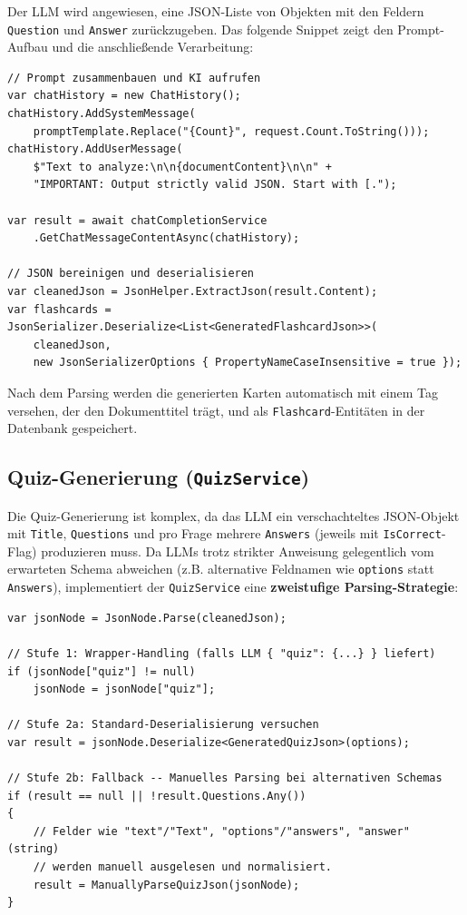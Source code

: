 Der LLM wird angewiesen, eine JSON-Liste von Objekten mit den Feldern \texttt{Question} und \texttt{Answer} zur\"uckzugeben. Das folgende Snippet zeigt den Prompt-Aufbau und die anschlie\ss{}ende Verarbeitung:

\begin{lstlisting}[language={[Sharp]C}, caption={KI-Aufruf und JSON-Parsing in FlashcardService.cs}]
// Prompt zusammenbauen und KI aufrufen
var chatHistory = new ChatHistory();
chatHistory.AddSystemMessage(
    promptTemplate.Replace("{Count}", request.Count.ToString()));
chatHistory.AddUserMessage(
    $"Text to analyze:\n\n{documentContent}\n\n" +
    "IMPORTANT: Output strictly valid JSON. Start with [.");

var result = await chatCompletionService
    .GetChatMessageContentAsync(chatHistory);

// JSON bereinigen und deserialisieren
var cleanedJson = JsonHelper.ExtractJson(result.Content);
var flashcards = JsonSerializer.Deserialize<List<GeneratedFlashcardJson>>(
    cleanedJson,
    new JsonSerializerOptions { PropertyNameCaseInsensitive = true });
\end{lstlisting}

Nach dem Parsing werden die generierten Karten automatisch mit einem Tag versehen, der den Dokumenttitel tr\"agt, und als \texttt{Flashcard}-Entit\"aten in der Datenbank gespeichert.

\newpage
\subsection{Quiz-Generierung (\texttt{QuizService})}

Die Quiz-Generierung ist komplex, da das LLM ein verschachteltes JSON-Objekt mit \texttt{Title}, \texttt{Questions} und pro Frage mehrere \texttt{Answers} (jeweils mit \texttt{IsCorrect}-Flag) produzieren muss. Da LLMs trotz strikter Anweisung gelegentlich vom erwarteten Schema abweichen (z.B. alternative Feldnamen wie \texttt{options} statt \texttt{Answers}), implementiert der \texttt{QuizService} eine \textbf{zweistufige Parsing-Strategie}:

\begin{lstlisting}[language={[Sharp]C}, caption={Robustes JSON-Parsing in QuizService.cs}]
var jsonNode = JsonNode.Parse(cleanedJson);

// Stufe 1: Wrapper-Handling (falls LLM { "quiz": {...} } liefert)
if (jsonNode["quiz"] != null)
    jsonNode = jsonNode["quiz"];

// Stufe 2a: Standard-Deserialisierung versuchen
var result = jsonNode.Deserialize<GeneratedQuizJson>(options);

// Stufe 2b: Fallback -- Manuelles Parsing bei alternativen Schemas
if (result == null || !result.Questions.Any())
{
    // Felder wie "text"/"Text", "options"/"answers", "answer" (string)
    // werden manuell ausgelesen und normalisiert.
    result = ManuallyParseQuizJson(jsonNode);
}
\end{lstlisting}

